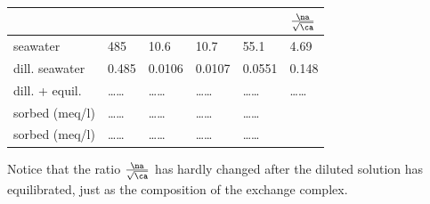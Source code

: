 \begin{table}[h]
\centering
\footnotesize
\begin{tabular}{llllll}
\toprule
 & \na	& \ka & \ca & \mg & $\frac{\na}{\sqrt{\ca}}$ \\
\midrule
seawater 				& 485   & 10.6   & 10.7   & 55.1   & 4.69 \\
dill. seawater  & 0.485 & 0.0106 & 0.0107 & 0.0551 & 0.148 \\
dill. + equil.  & \ldots\ldots & \ldots\ldots & \ldots\ldots & \ldots\ldots & \ldots\ldots \\
sorbed (meq/l)  & \ldots\ldots & \ldots\ldots & \ldots\ldots & \ldots\ldots & \\
sorbed (meq/l)  & \ldots\ldots & \ldots\ldots & \ldots\ldots & \ldots\ldots & \\
\bottomrule
\end{tabular}
\end{table}

Notice that the ratio $\frac{\na}{\sqrt{\ca}}$ has hardly changed after the diluted solution has equilibrated, just as the composition of the exchange complex.